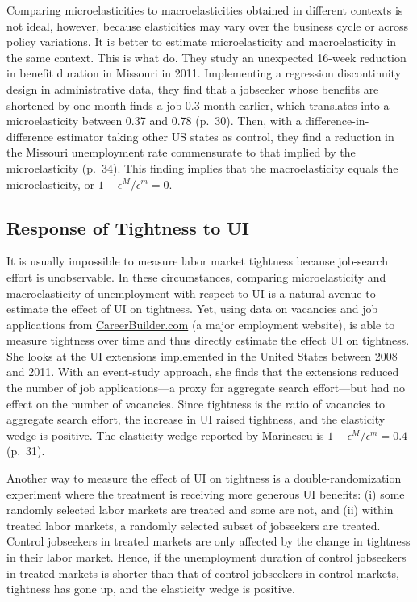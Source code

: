 \documentclass[letterpaper,12pt,leqno]{article}
\def \e{{\epsilon}}
\begin{document}
Comparing microelasticities to macroelasticities obtained in different contexts is not ideal, however, because elasticities may vary over the business cycle or across policy variations. It is better to estimate microelasticity and macroelasticity in the same context. This is what \citet{JM15} do. They study an unexpected 16-week reduction in benefit duration in Missouri in 2011. Implementing a regression discontinuity design in administrative data, they find that a jobseeker whose benefits are shortened by one month finds a job 0.3 month earlier, which translates into a microelasticity between 0.37 and 0.78 (p.~30). Then, with a difference-in-difference estimator taking other US states as control, they find a reduction in the Missouri unemployment rate commensurate to that implied by the microelasticity  (p.~34). This finding implies that the macroelasticity equals the microelasticity, or $1-\e^M/\e^m = 0$.

\subsection{Response of Tightness to UI}

It is usually impossible to measure labor market tightness because job-search effort is unobservable. In these circumstances, comparing microelasticity and macroelasticity of unemployment with respect to UI is a natural avenue to estimate the effect of UI on tightness. Yet, using data on vacancies and job applications from \url{CareerBuilder.com} (a major employment website), \citet{M14} is able to measure tightness over time and thus directly estimate the effect UI on tightness. She looks at the UI extensions implemented in the United States between 2008 and 2011. With an event-study approach, she finds that the extensions reduced the number of job applications---a proxy for aggregate search effort---but had no effect on the number of vacancies. Since tightness is the ratio of vacancies to aggregate search effort, the increase in UI raised tightness, and the elasticity wedge is positive. The elasticity wedge reported by Marinescu is $1-\e^{M}/\e^{m} = 0.4$ (p.~31).

Another way to measure the effect of UI on tightness is a double-randomization experiment where the treatment is receiving more generous UI benefits: (i) some randomly selected labor markets are treated and some are not, and (ii) within treated labor markets, a randomly selected subset of jobseekers are treated. Control jobseekers in treated markets are only affected by the change in tightness in their labor market. Hence, if the unemployment duration of control jobseekers in treated markets is shorter than that of control jobseekers in control markets, tightness has gone up, and the elasticity wedge is positive. 
\end{document}
